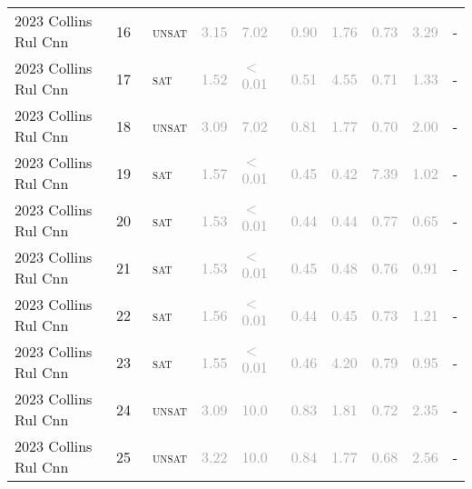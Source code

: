 \begin{center}
{\begin{longtable}{@{}llllllllll@{}}
2023 Collins Rul Cnn & 16 & ~\textsc{unsat} & \textcolor{darkgray}{3.15} & \textcolor{darkgray}{7.02} & \textcolor{darkgray}{0.90} & \textcolor{darkgray}{1.76} & \textcolor{darkgray}{0.73} & \textcolor{darkgray}{3.29} & - \\
2023 Collins Rul Cnn & 17 & ~\textsc{sat} & \textcolor{darkgray}{1.52} & \textcolor{darkgray}{$<$0.01} & \textcolor{darkgray}{0.51} & \textcolor{darkgray}{4.55} & \textcolor{darkgray}{0.71} & \textcolor{darkgray}{1.33} & - \\
2023 Collins Rul Cnn & 18 & ~\textsc{unsat} & \textcolor{darkgray}{3.09} & \textcolor{darkgray}{7.02} & \textcolor{darkgray}{0.81} & \textcolor{darkgray}{1.77} & \textcolor{darkgray}{0.70} & \textcolor{darkgray}{2.00} & - \\
2023 Collins Rul Cnn & 19 & ~\textsc{sat} & \textcolor{darkgray}{1.57} & \textcolor{darkgray}{$<$0.01} & \textcolor{darkgray}{0.45} & \textcolor{darkgray}{0.42} & \textcolor{darkgray}{7.39} & \textcolor{darkgray}{1.02} & - \\
2023 Collins Rul Cnn & 20 & ~\textsc{sat} & \textcolor{darkgray}{1.53} & \textcolor{darkgray}{$<$0.01} & \textcolor{darkgray}{0.44} & \textcolor{darkgray}{0.44} & \textcolor{darkgray}{0.77} & \textcolor{darkgray}{0.65} & - \\
2023 Collins Rul Cnn & 21 & ~\textsc{sat} & \textcolor{darkgray}{1.53} & \textcolor{darkgray}{$<$0.01} & \textcolor{darkgray}{0.45} & \textcolor{darkgray}{0.48} & \textcolor{darkgray}{0.76} & \textcolor{darkgray}{0.91} & - \\
2023 Collins Rul Cnn & 22 & ~\textsc{sat} & \textcolor{darkgray}{1.56} & \textcolor{darkgray}{$<$0.01} & \textcolor{darkgray}{0.44} & \textcolor{darkgray}{0.45} & \textcolor{darkgray}{0.73} & \textcolor{darkgray}{1.21} & - \\
2023 Collins Rul Cnn & 23 & ~\textsc{sat} & \textcolor{darkgray}{1.55} & \textcolor{darkgray}{$<$0.01} & \textcolor{darkgray}{0.46} & \textcolor{darkgray}{4.20} & \textcolor{darkgray}{0.79} & \textcolor{darkgray}{0.95} & - \\
2023 Collins Rul Cnn & 24 & ~\textsc{unsat} & \textcolor{darkgray}{3.09} & \textcolor{darkgray}{10.0} & \textcolor{darkgray}{0.83} & \textcolor{darkgray}{1.81} & \textcolor{darkgray}{0.72} & \textcolor{darkgray}{2.35} & - \\
2023 Collins Rul Cnn & 25 & ~\textsc{unsat} & \textcolor{darkgray}{3.22} & \textcolor{darkgray}{10.0} & \textcolor{darkgray}{0.84} & \textcolor{darkgray}{1.77} & \textcolor{darkgray}{0.68} & \textcolor{darkgray}{2.56} & - \\

\end{longtable}}
\end{center}
